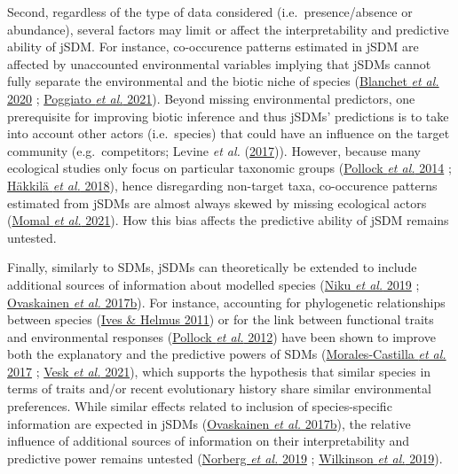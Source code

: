\documentclass[9pt,biorxiv,doublespacing,lineno]{lapreprint}
\begin{document}
Second, regardless of the type of data considered (i.e.~presence/absence
or abundance), several factors may limit or affect the interpretability
and predictive ability of jSDM. For instance, co-occurence patterns
estimated in jSDM are affected by unaccounted environmental variables
implying that jSDMs cannot fully separate the environmental and the
biotic niche of species (\protect\hyperlink{ref-Blanchet_2020}{Blanchet
\emph{et al.} 2020} ; \protect\hyperlink{ref-Poggiato_2021}{Poggiato
\emph{et al.} 2021}). Beyond missing environmental predictors, one
prerequisite for improving biotic inference and thus jSDMs' predictions
is to take into account other actors (i.e.~species) that could have an
influence on the target community (e.g.~competitors; Levine \emph{et
al.} (\protect\hyperlink{ref-Levine_2017}{2017})). However, because many
ecological studies only focus on particular taxonomic groups
(\protect\hyperlink{ref-Pollock_2014}{Pollock \emph{et al.} 2014} ;
\protect\hyperlink{ref-Hakkila_2018}{Häkkilä \emph{et al.} 2018}), hence
disregarding non-target taxa, co-occurence patterns estimated from jSDMs
are almost always skewed by missing ecological actors
(\protect\hyperlink{ref-Momal_2021}{Momal \emph{et al.} 2021}). How this
bias affects the predictive ability of jSDM remains untested.

Finally, similarly to SDMs, jSDMs can theoretically be extended to
include additional sources of information about modelled species
(\protect\hyperlink{ref-Niku_2019}{Niku \emph{et al.} 2019} ;
\protect\hyperlink{ref-Ovaskainen_2017a}{Ovaskainen \emph{et al.}
2017b}). For instance, accounting for phylogenetic relationships between
species (\protect\hyperlink{ref-Ives_2011}{Ives \& Helmus 2011}) or for
the link between functional traits and environmental responses
(\protect\hyperlink{ref-Pollock_2012}{Pollock \emph{et al.} 2012}) have
been shown to improve both the explanatory and the predictive powers of
SDMs (\protect\hyperlink{ref-Morales-Castilla_2017}{Morales-Castilla
\emph{et al.} 2017} ; \protect\hyperlink{ref-Vesk_2021}{Vesk \emph{et
al.} 2021}), which supports the hypothesis that similar species in terms
of traits and/or recent evolutionary history share similar environmental
preferences. While similar effects related to inclusion of
species-specific information are expected in jSDMs
(\protect\hyperlink{ref-Ovaskainen_2017a}{Ovaskainen \emph{et al.}
2017b}), the relative influence of additional sources of information on
their interpretability and predictive power remains untested
(\protect\hyperlink{ref-Norberg_2019}{Norberg \emph{et al.} 2019} ;
\protect\hyperlink{ref-Wilkinson_2019}{Wilkinson \emph{et al.} 2019}).
\end{document}
